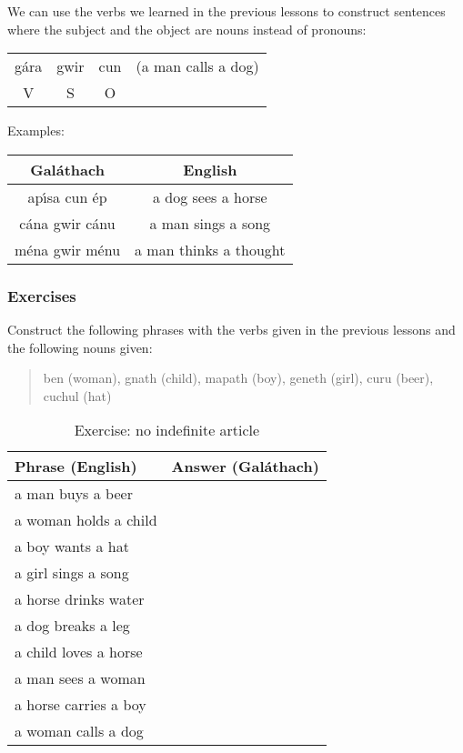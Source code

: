 \noindent We can use the verbs we learned in the previous lessons to construct sentences where the subject and the object are nouns instead of pronouns:
\begin{table}[H]
\begin{tabu}{cccc}
  g\'{a}ra & gwir & cun & (a man calls a dog)\\
  V & S & O &
\end{tabu}
\label{examples_vso}
\end{table}

\noindent Examples:
\begin{table}[H]
\centering
\begin{tabu}{c|c}
  \textbf{Gal\'{a}thach} & \textbf{English}\\
  \toprule
  ap\'{\i}sa cun \'{e}p & a dog sees a horse\\
  c\'{a}na gwir c\'{a}nu & a man sings a song\\
  m\'{e}na gwir m\'{e}nu & a man thinks a thought
\end{tabu}
\label{examples_vso_more_examples}
\end{table}

\subsubsection{Exercises}

\noindent Construct the following phrases with the verbs given in the previous lessons and the following nouns given:

\begin{quote}
ben (woman), gnath (child), mapath (boy), geneth (girl), curu (beer), cuchul (hat)
\end{quote}

\begin{table}[H]
\centering
\begin{tabu}{|l|p{10.0cm}|}
  \toprule
  \textbf{Phrase (English)} & \textbf{Answer (Gal\'{a}thach)}\\
  \toprule
  a man buys a beer & \\
  \midrule
  a woman holds a child & \\
  \midrule
  a boy wants a hat & \\
  \midrule
  a girl sings a song & \\
  \midrule
  a horse drinks water & \\
  \midrule
  a dog breaks a leg & \\
  \midrule
  a child loves a horse & \\
  \midrule
  a man sees a woman & \\
  \midrule
  a horse carries a boy & \\
  \midrule
  a woman calls a dog & \\
  \bottomrule
\end{tabu}
\label{exercises_no_indefinite_article}
\caption{Exercise: no indefinite article}
\end{table}

